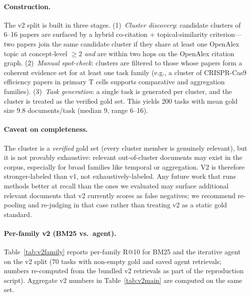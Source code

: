 \documentclass{article}
\begin{document}
\paragraph{Construction.} The v2 split is built in three stages. (1)~\emph{Cluster discovery}: candidate clusters of 6--16 papers are surfaced by a hybrid co-citation + topical-similarity criterion---two papers join the same candidate cluster if they share at least one OpenAlex topic at concept-level $\geq 2$ \emph{and} are within two hops on the OpenAlex citation graph. (2)~\emph{Manual spot-check}: clusters are filtered to those whose papers form a coherent evidence set for at least one task family (e.g., a cluster of CRISPR-Cas9 efficiency papers in primary T cells supports comparative and aggregation families). (3)~\emph{Task generation}: a single task is generated per cluster, and the cluster is treated as the verified gold set. This yields 200 tasks with mean gold size 9.8 documents/task (median 9, range 6--16).

\paragraph{Caveat on completeness.} The cluster is a \emph{verified} gold set (every cluster member is genuinely relevant), but it is not provably exhaustive: relevant out-of-cluster documents may exist in the corpus, especially for broad families like temporal or aggregation. V2 is therefore stronger-labeled than v1, not exhaustively-labeled. Any future work that runs methods better at recall than the ones we evaluated may surface additional relevant documents that v2 currently scores as false negatives; we recommend re-pooling and re-judging in that case rather than treating v2 as a static gold standard.

\paragraph{Per-family v2 (BM25 vs.\ agent).} Table~\ref{tab:v2family} reports per-family R@10 for BM25 and the iterative agent on the v2 split (70 tasks with non-empty gold and saved agent retrievals; numbers re-computed from the bundled v2 retrievals as part of the reproduction script). Aggregate v2 numbers in Table~\ref{tab:v2main} are computed on the same set.
\end{document}
